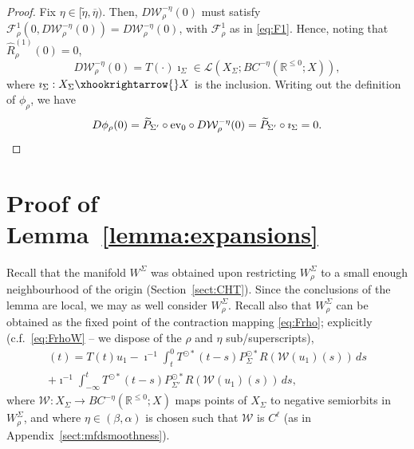 \documentclass[a4paper, 12pt, oneside, reqno, notitlepage]{amsart}
\theoremstyle{plain}
\theoremstyle{definition}
\theoremstyle{remark}
\begin{document}
\begin{proof}
    Fix $\eta \in [\tilde{\eta},\overline{\eta})$.
    Then, $D \mathcal{W}_\rho^{-\eta}(0)$ must satisfy $\mathcal{F}^1_\rho (0,D \mathcal{W}_\rho^{-\eta}(0)) = D \mathcal{W}_\rho^{-\eta}(0)$, with $\mathcal{F}^1_\rho$ as in \eqref{eq:F1}.
    Hence, noting that $\widehat{R}_\rho^{(1)}(0) = 0$,
    \begin{equation}
        D \mathcal{W}_\rho^{-\eta}(0) = T(\cdot) \imath_\Sigma \in \mathcal{L}(X_\Sigma; BC^{-\eta}(\mathbb{R}^{\leq 0}; X)),
        \label{eq:DmathcalW0}
    \end{equation}
    where $\imath_\Sigma : X_\Sigma \xhookrightarrow{} X$ is the inclusion.
    Writing out the definition of $\phi_\rho$, we have
    \begin{displaymath}
        D \phi_\rho (0) = \widetilde{P}_{\Sigma'} \circ\mathrm{ev}_0 \circ D \mathcal{W}^{-\eta}_\rho (0) = \widetilde{P}_{\Sigma'} \circ \imath_\Sigma = 0. \qedhere
    \end{displaymath}
\end{proof}

\section{Proof of Lemma~\ref{lemma:expansions}}
\label{sect:expansionslemmaproof}

Recall that the manifold $W^\Sigma$ was obtained upon restricting $W^\Sigma_\rho$ to a small enough neighbourhood of the origin (Section~\ref{sect:CHT}). 
Since the conclusions of the lemma are local, we may as well consider $W^\Sigma_\rho$.
Recall also that $W^\Sigma_\rho$ can be obtained as the fixed point of the contraction mapping \eqref{eq:Frho}; explicitly (c.f.\ \eqref{eq:FrhoW} -- we dispose of the $\rho$ and $\eta$ sub/superscripts),
\begin{multline}
    [\mathcal{W}(u_1)](t) = T(t) u_1 - \imath^{-1} \int_t^0 T^{\odot *} (t-s) P_{\Sigma}^{\odot *} R(\mathcal{W}(u_1)(s)) \, ds \\
        + \imath^{-1} \int_{-\infty}^t T^{\odot *} (t-s) P_{\Sigma'}^{\odot *} R(\mathcal{W}(u_1)(s)) \, ds, \label{eq:mathcalW4exp}
\end{multline}
where $\mathcal{W}: X_\Sigma \to BC^{-\eta}(\mathbb{R}^{\leq 0};X)$ maps points of $X_\Sigma$ to negative semiorbits in $W^\Sigma_\rho$, and where  $\eta \in (\beta,\alpha)$ is chosen such that $\mathcal{W}$ is $C^\ell$ (as in Appendix~\ref{sect:mfdsmoothness}). 
\end{document}
